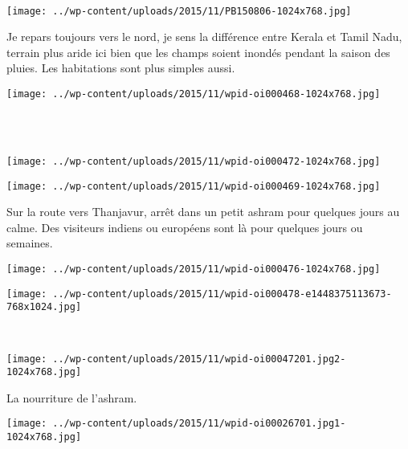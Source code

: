 ~
\vspace{0.75mm}
\begin{center} \texttt{[image: ../wp-content/uploads/2015/11/PB150806-1024x768.jpg]} \end{center}

 Je repars toujours vers le nord, je sens la différence entre Kerala et Tamil Nadu, terrain plus aride ici bien que les champs soient inondés pendant la saison des pluies. Les habitations sont plus simples aussi. 
\begin{center} \texttt{[image: ../wp-content/uploads/2015/11/wpid-oi000468-1024x768.jpg]} \end{center}
\vspace{-\topsep}
\pagebreak

~\\~\\
\vspace{-0.5mm}
\begin{center} \texttt{[image: ../wp-content/uploads/2015/11/wpid-oi000472-1024x768.jpg]} \end{center}
\vfill
\begin{center} \texttt{[image: ../wp-content/uploads/2015/11/wpid-oi000469-1024x768.jpg]} \end{center}
\vspace{-\topsep}
\vspace{-0.75mm}
\pagebreak
 
 Sur la route vers Thanjavur, arrêt dans un petit ashram pour quelques jours au calme. Des visiteurs indiens ou européens sont là pour quelques jours ou semaines. 
\begin{center} \texttt{[image: ../wp-content/uploads/2015/11/wpid-oi000476-1024x768.jpg]} \end{center}
\begin{center} \texttt{[image: ../wp-content/uploads/2015/11/wpid-oi000478-e1448375113673-768x1024.jpg]} \end{center}
\vspace{-\topsep}
\pagebreak

~
\begin{center} \texttt{[image: ../wp-content/uploads/2015/11/wpid-oi00047201.jpg2-1024x768.jpg]} \end{center}

  La nourriture de l'ashram. 
\begin{center} \texttt{[image: ../wp-content/uploads/2015/11/wpid-oi00026701.jpg1-1024x768.jpg]} \end{center}
\vspace{-\topsep}
\pagebreak
 
